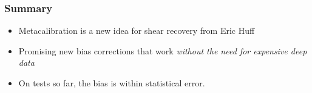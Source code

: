 \documentclass{beamer}
\begin{document}
\frame
{
    \frametitle{Summary}

 
    \begin{itemize}
        \item Metacalibration is a new idea for shear recovery from
            Eric Huff

        \item Promising new bias corrections that work {\color{gold} {\em without the need
            for expensive deep data} }

        \item On tests so far, the bias is within statistical error.
        
    \end{itemize}

}
\end{document}
